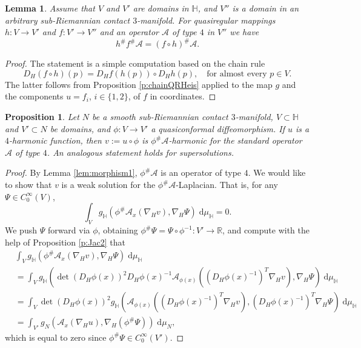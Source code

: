 \documentclass[10pt,letterpaper]{amsart}
\newtheorem{prop}[thm]{Proposition}
\newtheorem{lemma}[thm]{Lemma}
\theoremstyle{definition}
\numberwithin{thm}{subsection}
\numberwithin{equation}{section}
\begin{document}
\begin{lemma}\label{lem:morphism2} Assume that $V$ and $V'$ are domains in ${\mathbb H}$, and $V''$ is a domain in an arbitrary sub-Riemannian contact $3$-manifold.
For quasiregular mappings $h:V \to V'$ and $f:V' \to V''$ and an operator $\mathcal A$ of type $4$ in $V''$ we have
$$h^\# f^\# \mathcal A = (f\circ h)^\#\mathcal A.$$
\end{lemma}

\begin{proof}
The statement is a simple computation based on the chain rule
\begin{displaymath}
D_H (f \circ h)(p) = D_H f(h(p)) \circ D_H h(p),\quad \text{for almost every }p\in V.
\end{displaymath}
The latter follows from Proposition \ref{p:chainQRHeis} applied to
the map $g$ and the components $u=f_i$, $i\in \{1,2\}$, of $f$ in
coordinates.
\end{proof}

\begin{prop}\label{prop:easyMorphism}
Let $N$ be a smooth sub-Riemannian contact $3$-manifold, $V\subset
{\mathbb H}$ and $V'\subset N$ be domains, and $\phi:V\to V'$  a
quasiconformal diffeomorphism. If $u$ is a $4$-harmonic function,
then $v:= u \circ \phi$ is $\phi^\#\mathcal A$-harmonic for the
standard operator $\mathcal A$ of type $4$. An analogous statement
holds for supersolutions.
\end{prop}

\begin{proof}
By Lemma \ref{lem:morphism1}, $\phi^\# \mathcal A$ is an operator
of type $4$. We would like to show that $v$ is a weak solution for
the $\phi^\# \mathcal A$-Laplacian. That is, for any $\Psi \in
C_0^\infty(V)$,
$$\int_V g_{\mathbb H}( \phi^\#\mathcal A_x(\nabla_H v), \nabla_H \Psi ) \;\mathrm{d}\mu_{\mathbb H}= 0.$$
We push $\Psi$ forward via $\phi$, obtaining $\phi^\#\Psi = \Psi \circ \phi^{-1}:V'\to{\mathbb R}$, and compute with the help of Proposition \ref{p:Jac2} that
\begin{align*}
&\int_V g_{\mathbb H} (\phi^\#\mathcal A_x(\nabla_H v), \nabla_H \Psi )  \;\mathrm{d}\mu_{\mathbb H}\\
 &= \int_V g_{\mathbb H} ( \det(D_H\phi(x))^2 D_H\phi(x)^{-1} \mathcal A_{\phi(x)}((D_H\phi(x)^{-1})^T \nabla_H v), \nabla_H \Psi )  \;\mathrm{d}\mu_{\mathbb H}\\
 &= \int_V \det(D_H\phi(x))^2  g_{\mathbb H} (  \mathcal A_{\phi(x)}((D_H\phi(x)^{-1})^T  \nabla_H v), (D_H\phi(x)^{-1})^T\nabla_H \Psi )  \;\mathrm{d}\mu_{\mathbb H}\\
 &= \int_{V'}  g_N(  \mathcal A_{x}(\nabla_H u), \nabla_H (\phi^\#\Psi))\;\mathrm{d}\mu_{N},
\end{align*}
which is equal to zero since $\phi^\# \Psi \in C^\infty_0(V')$.
\end{proof}
\end{document}
